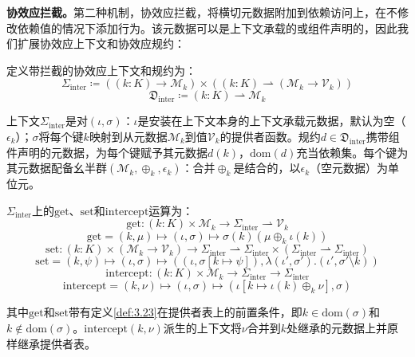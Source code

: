 \textbf{协效应拦截。}第二种机制，协效应拦截，将横切元数据附加到依赖访问上，在不修改依赖值的情况下添加行为。该元数据可以是上下文承载的或组件声明的，因此我们扩展协效应上下文和协效应规约：

\begin{definition}\label{def:3.30}
定义带拦截的协效应上下文和规约为：
\begin{equation}\label{eq:3.29}
\Sigma_{\mathrm{inter}} \coloneqq ((k: K) \to \mathcal{M}_k) \times ((k: K) \rightharpoonup (\mathcal{M}_k \to \mathcal{V}_k))
\end{equation}
\[
\mathfrak{D}_{\mathrm{inter}} \coloneqq (k: K) \rightharpoonup \mathcal{M}_k
\]
\end{definition}

上下文$\Sigma_{\mathrm{inter}}$是对$(\iota, \sigma)$：$\iota$是安装在上下文本身的上下文承载元数据，默认为空（$\epsilon_k$）；$\sigma$将每个键$k$映射到从元数据$\mathcal{M}_k$到值$\mathcal{V}_k$的提供者函数。规约$d \in \mathfrak{D}_{\mathrm{inter}}$携带组件声明的元数据，为每个键赋予其元数据$d(k)$，$\mathrm{dom}(d)$充当依赖集。每个键为其元数据配备幺半群$(\mathcal{M}_k, \oplus_k, \epsilon_k)$：合并$\oplus_k$是结合的，以$\epsilon_k$（空元数据）为单位元。

\begin{definition}\label{def:3.31}
$\Sigma_{\mathrm{inter}}$上的$\mathrm{get}$、$\mathrm{set}$和$\mathrm{intercept}$运算为：
\begin{equation}\label{eq:3.30}
\mathrm{get} : (k: K) \times \mathcal{M}_k \to \Sigma_{\mathrm{inter}} \rightharpoonup \mathcal{V}_k
\end{equation}
\[
\mathrm{get} = (k, \mu) \mapsto (\iota, \sigma) \mapsto \sigma(k)(\mu \oplus_k \iota(k))
\]
\[
\mathrm{set} : (k: K) \times (\mathcal{M}_k \to \mathcal{V}_k) \to \Sigma_{\mathrm{inter}} \rightharpoonup \Sigma_{\mathrm{inter}} \times (\Sigma_{\mathrm{inter}} \rightharpoonup \Sigma_{\mathrm{inter}})
\]
\[
\mathrm{set} = (k, \psi) \mapsto (\iota, \sigma) \mapsto ((\iota, \sigma[k \mapsto \psi]), \lambda(\iota', \sigma').(\iota', \sigma' \setminus k))
\]
\[
\mathrm{intercept} : (k: K) \times \mathcal{M}_k \to \Sigma_{\mathrm{inter}} \to \Sigma_{\mathrm{inter}}
\]
\[
\mathrm{intercept} = (k, \nu) \mapsto (\iota, \sigma) \mapsto (\iota[k \mapsto \iota(k) \oplus_k \nu], \sigma)
\]
\end{definition}

其中$\mathrm{get}$和$\mathrm{set}$带有定义\ref{def:3.23}在提供者表上的前置条件，即$k \in \mathrm{dom}(\sigma)$和$k \notin \mathrm{dom}(\sigma)$。$\mathrm{intercept}(k, \nu)$派生的上下文将$\nu$合并到$k$处继承的元数据上并原样继承提供者表。

